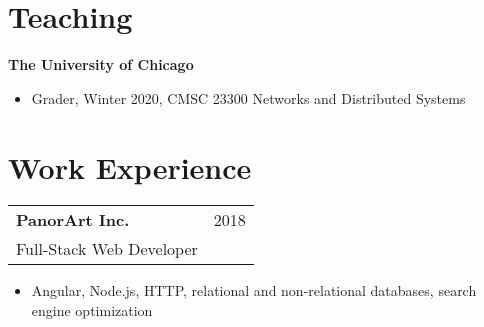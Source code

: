 \documentclass[letterpaper, 11pt]{article}
\begin{document}
\section{Teaching}
\textbf{The University of Chicago}
\begin{itemize}
  \item Grader, Winter 2020, CMSC 23300 Networks and Distributed Systems
\end{itemize}

\section{Work Experience}
\begin{tabular}{@{} L{12cm} @{} R{4.51cm} @{}}
  \textbf{PanorArt Inc.} & 2018 \\
  Full-Stack Web Developer\\
\end{tabular}
\begin{itemize}
\item Angular, Node.js, HTTP, relational and non-relational databases, search engine optimization
\end{itemize}
\end{document}
